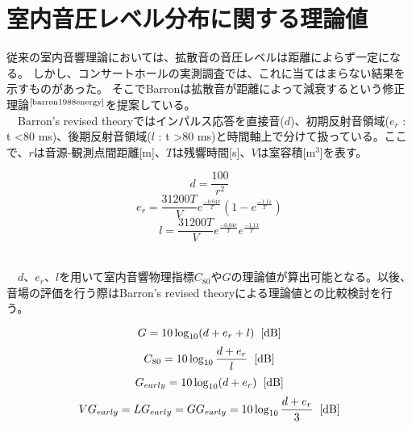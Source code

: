 \section{室内音圧レベル分布に関する理論値}
従来の室内音響理論においては、拡散音の音圧レベルは距離によらず一定になる。
しかし、コンサートホールの実測調査では、これに当てはまらない結果を示すものがあった。
そこでBarronは拡散音が距離によって減衰するという修正理論$^{\text{\cite{barron1988energy}}}$を提案している。
\\　Barron's revised theoryではインパルス応答を直接音($d$)、初期反射音領域($e_r$ : t \textless 80 ms)、後期反射音領域($l$ : t \textgreater 80 ms)と時間軸上で分けて扱っている。ここで、$r$は音源-観測点間距離[m]、$T$は残響時間[s]、$V$は室容積[m$^3$]を表す。
\begin{table}[htbp]
    \begin{equation}
        \label{eq:d}
        d=\frac{100}{r^2}
    \end{equation}
    \begin{equation}
        e_r=\frac{31200T}{V}e^{\frac{-0.04r}{T}}(1-e^{\frac{-1.11}{T}})
    \end{equation}
    \begin{equation}
        l=\frac{31200T}{V}e^{\frac{-0.04r}{T}}e^{\frac{-1.11}{T}}
    \end{equation}
\end{table}
\\　$d$、$e_r$、$l$を用いて室内音響物理指標$C_{80}$や$G$の理論値が算出可能となる。以後、音場の評価を行う際はBarron's revised theoryによる理論値との比較検討を行う。
\begin{table}[htbp]
    \begin{equation}
        G=10\log_{10}(d+e_r+l)\hspace{2mm}\textrm{[dB]}
    \end{equation}
    \begin{equation}
        C_{80}=10\log_{10}\frac{d+e_r}{l}\hspace{2mm}\textrm{[dB]}
    \end{equation}
        \begin{equation}
        G_{early}=10\log_{10}(d+e_r)\hspace{2mm}\textrm{[dB]}
    \end{equation}
    \begin{equation}
        VG_{early}=LG_{early}=GG_{early}=10\log_{10}\frac{d+e_r}{3}\hspace{2mm}\textrm{[dB]}
    \end{equation}
\end{table}